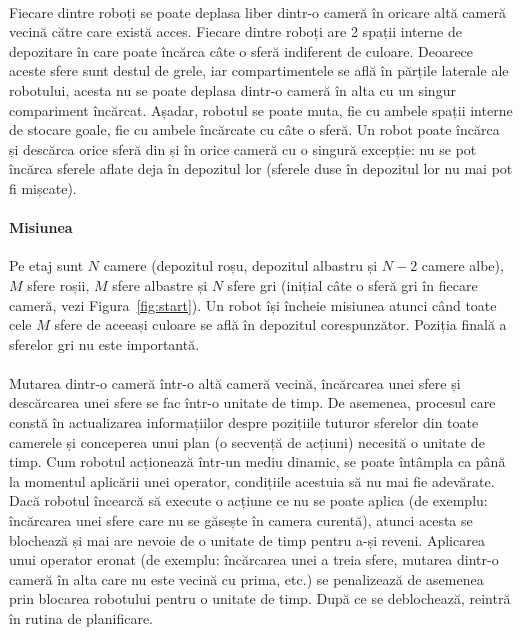 \documentclass[12pt]{article}
\begin{document}
\paragraph{}

Fiecare dintre roboți se poate deplasa liber dintr-o cameră în oricare
altă cameră vecină către care există acces. Fiecare dintre roboți are 2 spații
interne de depozitare în care poate încărca câte o sferă indiferent de
culoare. Deoarece aceste sfere sunt destul de grele, iar
compartimentele se află în părțile laterale ale robotului, acesta nu
se poate deplasa dintr-o cameră în alta cu un singur compariment
încărcat. Așadar, robotul se poate muta, fie cu ambele spații interne
de stocare goale, fie cu ambele încărcate cu câte o sferă. Un robot
poate încărca și descărca orice sferă din și în orice cameră cu o
singură excepție: nu se pot încărca sferele aflate deja în depozitul
lor (sferele duse în depozitul lor nu mai pot fi mișcate).

\paragraph{Misiunea}

Pe etaj sunt $N$ camere (depozitul roșu, depozitul albastru și $N-2$
camere albe), $M$ sfere roșii, $M$ sfere albastre și $N$ sfere gri
(inițial câte o sferă gri în fiecare cameră, vezi
Figura~\ref{fig:start}). Un robot își încheie misiunea atunci când
toate cele $M$ sfere de aceeași culoare se află în depozitul
corespunzător. Poziția finală a sferelor gri nu este importantă.

\paragraph{}

Mutarea dintr-o cameră într-o altă cameră vecină, încărcarea unei
sfere și descărcarea unei sfere se fac într-o unitate de timp. De
asemenea, procesul care constă în actualizarea informațiilor despre
pozițiile tuturor sferelor din toate camerele și conceperea unui plan
(o secvență de acțiuni) necesită o unitate de timp. Cum robotul
acționează într-un mediu dinamic, se poate întâmpla ca până la
momentul aplicării unei operator, condițiile acestuia să nu mai fie
adevărate. Dacă robotul încearcă să execute o acțiune ce nu se poate
aplica (de exemplu: încărcarea unei sfere care nu se găsește în camera
curentă), atunci acesta se blochează și mai are nevoie de o unitate de
timp pentru a-și reveni. Aplicarea unui operator eronat (de exemplu:
încărcarea unei a treia sfere, mutarea dintr-o cameră în alta care nu
este vecină cu prima, etc.) se penalizează de asemenea prin blocarea
robotului pentru o unitate de timp. După ce se deblochează, reintră în
rutina de planificare.
\end{document}
